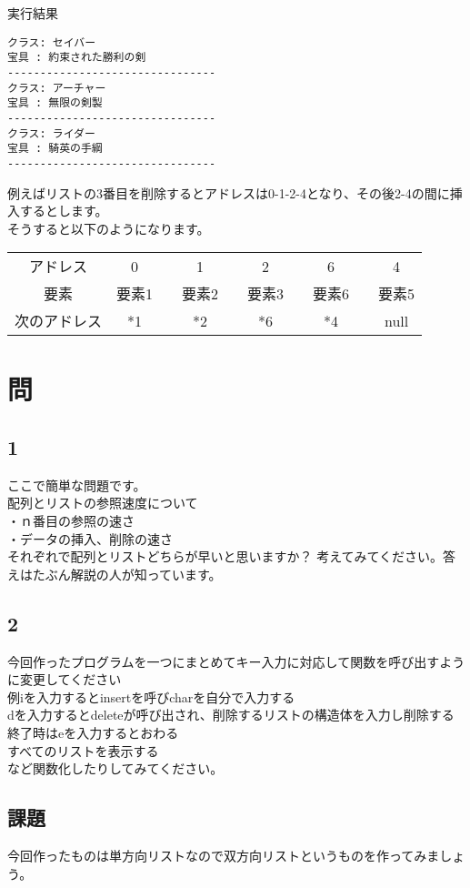 
\begin{itembox}{実行結果}
\begin{verbatim}
クラス: セイバー
宝具 : 約束された勝利の剣
--------------------------------
クラス: アーチャー
宝具 : 無限の剣製
--------------------------------
クラス: ライダー
宝具 : 騎英の手綱
--------------------------------
\end{verbatim}
\end{itembox}
例えばリストの3番目を削除するとアドレスは0-1-2-4となり、その後2-4の間に挿入するとします。\\
そうすると以下のようになります。
\begin{table}[htb]
\begin{center}
\begin{tabular}{|c|c|c|c|c|c|c|c|c|c|}
\cline{1-1}\cline{2-2}\cline{4-4}\cline{6-6}\cline{8-8}\cline{10-10}
アドレス & 0 && 1 && 2 && 6 && 4 \\ \cline{1-1}\cline{2-2}\cline{4-4}\cline{6-6}\cline{8-8}\cline{10-10}
要素 & 要素1 && 要素2 && 要素3 && 要素6 && 要素5\\ \cline{1-1}\cline{2-2}\cline{4-4}\cline{6-6}\cline{8-8}\cline{10-10}
次のアドレス & *1 && *2 && *6 && *4 && null   \\ 
\cline{1-1}\cline{2-2}\cline{4-4}\cline{6-6}\cline{8-8}\cline{10-10}
\end{tabular}
\end{center}
\end{table}

\section{問}
\subsection{1}
ここで簡単な問題です。\\
配列とリストの参照速度について\\
・ｎ番目の参照の速さ\\
・データの挿入、削除の速さ\\
それぞれで配列とリストどちらが早いと思いますか？
考えてみてください。答えはたぶん解説の人が知っています。

\subsection{2}
今回作ったプログラムを一つにまとめてキー入力に対応して関数を呼び出すように変更してください\\
例iを入力するとinsertを呼びcharを自分で入力する\\
dを入力するとdeleteが呼び出され、削除するリストの構造体を入力し削除する\\
終了時はeを入力するとおわる\\
すべてのリストを表示する\\
など関数化したりしてみてください。

\subsection{課題}
今回作ったものは単方向リストなので双方向リストというものを作ってみましょう。


